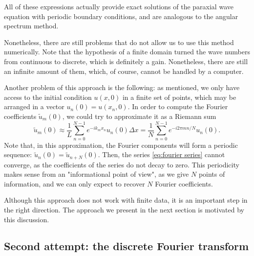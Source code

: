 \documentclass[a4paper,10pt]{report}
\begin{document}
All of these expressions actually provide exact solutions of the paraxial wave equation with periodic boundary conditions, and are analogous to the angular spectrum method. 

Nonetheless, there are still problems that do not allow us to use this method numerically. Note that the hypothesis of a finite domain turned the wave numbers from continuous to discrete, which is definitely a gain. Nonetheless, there are still an infinite amount of them, which, of course, cannot be handled by a computer.

Another problem of this approach is the following: as mentioned, we only have access to the initial condition $u(x,0)$ in a finite set of points, which may be arranged in a vector $u_n(0) = u(x_n,0)$. In order to compute the Fourier coefficients $\tilde{u}_m(0)$, we could try to approximate it as a Riemann sum
\begin{equation}
    \label{eq:fourier coefficients approximation}
    \tilde{u}_m(0) \approx \frac{1}{L} \sum_{n=0}^{N-1} e^{-i k_m x_n} u_n(0) \Delta x = \frac{1}{N} \sum_{n=0}^{N-1} e^{-i 2\pi mn/N} u_n(0).
\end{equation}
Note that, in this approximation, the Fourier components will form a periodic sequence: $\tilde{u}_n(0) = \tilde{u}_{n+N}(0)$. Then, the series \eqref{eq:fourier series} cannot converge, as the coefficients of the series do not decay to zero. This periodicity makes sense from an "informational point of view", as we give $N$ points of information, and we can only expect to recover $N$ Fourier coefficients.

Although this approach does not work with finite data, it is an important step in the right direction. The approach we present in the next section is motivated by this discussion.

\subsection{Second attempt: the discrete Fourier transform}
\end{document}
